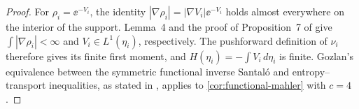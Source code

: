 \begin{proof}
For $\rho_i=\ee^{-V_i}$, the identity $|\nabla\rho_i|=|\nabla V_i|\ee^{-V_i}$ holds almost everywhere on the interior of the support. Lemma~4 and the proof of Proposition~7 of \cite{CorderoErausquinKlartag2015} give $\int |\nabla\rho_i|<\infty$ and $V_i\in L^1(\eta_i)$, respectively. The pushforward definition of $\nu_i$ therefore gives its finite first moment, and $H(\eta_i)=-\int V_i\,d\eta_i$ is finite. Gozlan's equivalence between the symmetric functional inverse Santal\'o and entropy--transport inequalities, as stated in \cite[Theorem~1.3 in the author manuscript]{FradeliziGozlanZugmeyer2023}, applies to \cref{cor:functional-mahler} with $c=4$.
\end{proof}
